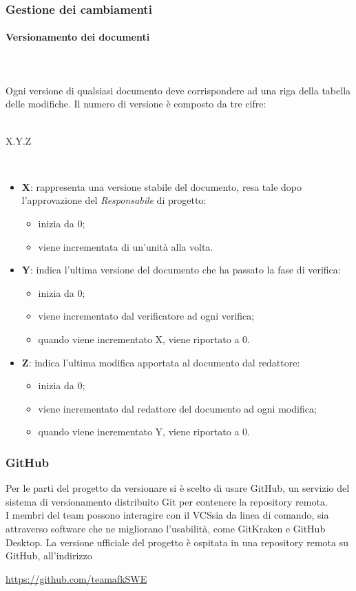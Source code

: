 \subsubsection{Gestione dei cambiamenti}
\paragraph{Versionamento dei documenti} \mbox{} \\ \mbox{} \\
Ogni versione di qualsiasi documento deve corrispondere ad una riga della tabella delle modifiche. Il numero di versione è composto da tre cifre: \\ \\
\centerline{X.Y.Z} \\
\begin{itemize}
\item \textbf{X}: rappresenta una versione stabile del documento, resa tale dopo l'approvazione del \textit{Responsabile} di progetto: \begin{itemize}
\item inizia da 0; 
\item viene incrementata di un'unità alla volta.
\end{itemize}
\item \textbf{Y}: indica l'ultima versione del documento che ha passato la fase di verifica: \begin{itemize}
\item inizia da 0;
\item viene incrementato dal verificatore ad ogni verifica;
\item quando viene incrementato X, viene riportato a 0.
\end{itemize} 
\item \textbf{Z}: indica l'ultima modifica apportata al documento dal redattore: \begin{itemize}
\item inizia da 0;
\item viene incrementato dal redattore del documento ad ogni modifica;
\item quando viene incrementato Y, viene riportato a 0.
\end{itemize}
\end{itemize}

\subsubsection{GitHub} 
Per le parti del progetto da versionare si è scelto di usare GitHub\glo, un servizio del sistema di versionamento distribuito Git per contenere la repository remota. \\
I membri del team possono interagire con il VCS\glo sia da linea di comando, sia attraverso software che ne migliorano l'usabilità, come GitKraken e GitHub Desktop. La versione ufficiale del progetto è ospitata in una repository remota su GitHub, all'indirizzo \\
\centerline{\url{https://github.com/teamafkSWE}}

